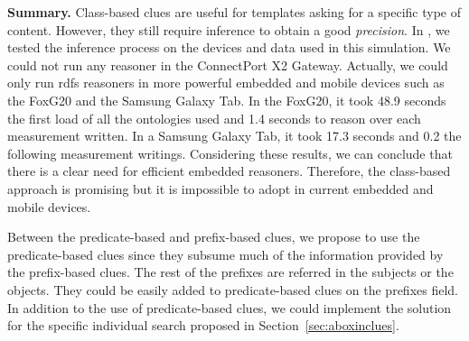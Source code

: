 



\medskip

\noindent\textbf{Summary.}
Class-based clues are useful for templates asking for a specific type of content.
However, they still require inference to obtain a good \emph{precision}.
In \citet{gomez-goiri_restful_2012}, we tested the inference process on the devices and data used in this simulation.
We could not run any reasoner in the ConnectPort X2 Gateway.
Actually, we could only run \acs{rdfs} reasoners in more powerful embedded and mobile devices such as the FoxG20 and the Samsung Galaxy Tab.
In the FoxG20, it took 48.9 seconds the first load of all the ontologies used and 1.4 seconds to reason over each measurement written.
In a Samsung Galaxy Tab, it took 17.3 seconds and 0.2 the following measurement writings.
Considering these results, we can conclude that there is a clear need for efficient embedded reasoners.
Therefore, the class-based approach is promising but it is impossible to adopt in current embedded and mobile devices.

Between the predicate-based and prefix-based clues, we propose to use the predicate-based clues since they subsume much of the information provided by the prefix-based clues.
The rest of the prefixes are referred in the subjects or the objects.
They could be easily added to predicate-based clues on the prefixes field.
In addition to the use of predicate-based clues, we could implement the solution for the specific individual search proposed in Section~\ref{sec:aboxinclues}.






